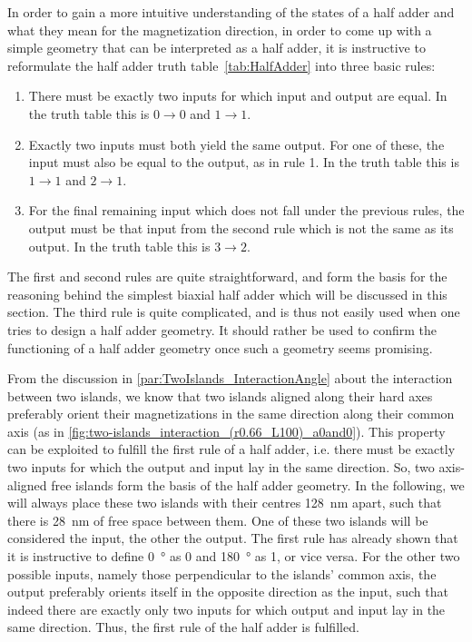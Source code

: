 \documentclass[11pt,a4paper,english]{article}
\begin{document}
In order to gain a more intuitive understanding of the states of a half adder and what they mean for the magnetization direction, in order to come up with a simple geometry that can be interpreted as a half adder, it is instructive to reformulate the half adder truth table~\ref{tab:HalfAdder} into three basic rules:
\begin{enumerate}
    \item There must be exactly two inputs for which input and output are equal. In the truth table this is $0\rightarrow0$ and $1\rightarrow1$.
    \item Exactly two inputs must both yield the same output. For one of these, the input must also be equal to the output, as in rule 1. In the truth table this is $1\rightarrow1$ and $2\rightarrow1$.
    \item For the final remaining input which does not fall under the previous rules, the output must be that input from the second rule which is not the same as its output. In the truth table this is $3\rightarrow2$.
\end{enumerate}
The first and second rules are quite straightforward, and form the basis for the reasoning behind the simplest biaxial half adder which will be discussed in this section. The third rule is quite complicated, and is thus not easily used when one tries to design a half adder geometry. It should rather be used to confirm the functioning of a half adder geometry once such a geometry seems promising. \par
From the discussion in \cref{par:TwoIslands_InteractionAngle} about the interaction between two islands, we know that two islands aligned along their hard axes preferably orient their magnetizations in the same direction along their common axis (as in \cref{fig:two-islands_interaction_(r0.66_L100)_a0and0}). This property can be exploited to fulfill the first rule of a half adder, i.e. there must be exactly two inputs for which the output and input lay in the same direction. So, two axis-aligned free islands form the basis of the half adder geometry. In the following, we will always place these two islands with their centres \SI{128}{\nano\metre} apart, such that there is \SI{28}{\nano\metre} of free space between them. One of these two islands will be considered the input, the other the output. The first rule has already shown that it is instructive to define \SI{0}{\degree} as 0 and \SI{180}{\degree} as 1, or vice versa. For the other two possible inputs, namely those perpendicular to the islands' common axis, the output preferably orients itself in the opposite direction as the input, such that indeed there are exactly only two inputs for which output and input lay in the same direction. Thus, the first rule of the half adder is fulfilled. \par
\end{document}
